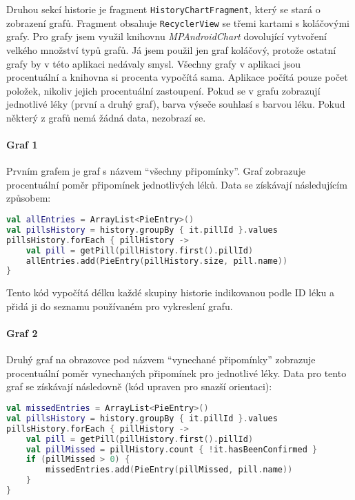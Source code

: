 \documentclass[../TakeYourPill.tex]{subfiles}
\begin{document}
Druhou sekcí historie je fragment \texttt{HistoryChartFragment}, který se stará o zobrazení grafů. Fragment obsahuje \texttt{RecyclerView} se třemi kartami s koláčovými grafy. Pro grafy jsem využil knihovnu \textit{MPAndroidChart} \cite{chart} dovolující vytvoření velkého množství typů grafů. Já jsem použil jen graf koláčový, protože ostatní grafy by v této aplikaci nedávaly smysl. Všechny grafy v aplikaci jsou procentuální a knihovna si procenta vypočítá sama. Aplikace počítá pouze počet položek, nikoliv jejich procentuální zastoupení. Pokud se v grafu zobrazují jednotlivé léky (první a druhý graf), barva výseče souhlasí s barvou léku. Pokud některý z grafů nemá žádná data, nezobrazí se.

\paragraph{Graf 1} Prvním grafem je graf s názvem \enquote{všechny připomínky}. Graf zobrazuje procentuální poměr připomínek jednotlivých léků. Data se získávají následujícím způsobem:

\setmonofont{JetBrains Mono}
\begin{lstlisting}[language=Kotlin]
val allEntries = ArrayList<PieEntry>()
val pillsHistory = history.groupBy { it.pillId }.values
pillsHistory.forEach { pillHistory ->
    val pill = getPill(pillHistory.first().pillId)
    allEntries.add(PieEntry(pillHistory.size, pill.name))
}
\end{lstlisting}
\setmonofont{Latin Modern Mono}

Tento kód vypočítá délku každé skupiny historie indikovanou podle ID léku a přidá ji do seznamu používaném pro vykreslení grafu.


\paragraph{Graf 2} Druhý graf na obrazovce pod názvem \enquote{vynechané připomínky} zobrazuje procentuální poměr vynechaných připomínek pro jednotlivé léky. Data pro tento graf se získávají následovně (kód upraven pro snazší orientaci):

\setmonofont{JetBrains Mono}
\begin{lstlisting}[language=Kotlin]
val missedEntries = ArrayList<PieEntry>()
val pillsHistory = history.groupBy { it.pillId }.values
pillsHistory.forEach { pillHistory ->
    val pill = getPill(pillHistory.first().pillId)
    val pillMissed = pillHistory.count { !it.hasBeenConfirmed }
    if (pillMissed > 0) {
        missedEntries.add(PieEntry(pillMissed, pill.name))
    }
}
\end{lstlisting}
\setmonofont{Latin Modern Mono}
\end{document}
